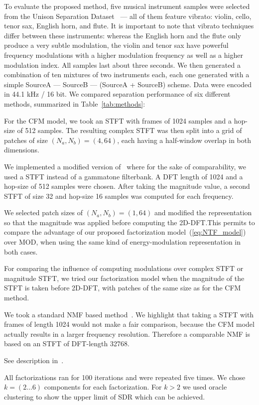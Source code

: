 To evaluate the proposed method, five musical instrument samples were selected from the Unison Separation Dataset~\cite{oss_unison} --- all of them feature vibrato: violin, cello, tenor sax, English horn, and flute. It is important to note that vibrato techniques differ between these instruments: whereas the English horn and the flute only produce a very subtle modulation, the violin and tenor sax have powerful frequency modulations with a higher modulation frequency as well as a higher modulation index. 
All samples last about three seconds. 
We then generated a combination of ten mixtures of two instruments each, each one generated with a simple SourceA --- SourceB --- (SourceA + SourceB) scheme. Data were encoded in 44.1 kHz / 16 bit.
We compared separation performance of six different methods, summarized in Table~\ref{tab:methods}:
\begin{description}[style=unboxed,leftmargin=0cm]
\item[CFM] For the CFM model, we took an STFT with frames of 1024 samples and a hop-size of 512 samples. The resulting complex STFT was then split into a grid of patches of size $(N_a, N_b) = (4, 64)$, each having a half-window overlap in both dimensions.
\item[MOD] We implemented a modified version of~\cite{barker13} where for the sake of comparability, we used a STFT instead of a gammatone filterbank. A DFT length of 1024 and a hop-size of 512 samples were chosen. After taking the magnitude value, a second STFT of size 32 and hop-size 16 samples was computed for each frequency.
\item[CFMMOD] We selected patch sizes of $(N_a, N_b) = (1, 64)$ and modified the representation so that the magnitude was applied before computing the 2D-DFT.\@ This permits to compare the advantage of our proposed factorization model~(\ref{eq:NTF_model}) over MOD, when using the same kind of energy-modulation representation in both cases.
\item[CFMM] For comparing the influence of computing modulations over complex STFT or magnitude STFT, we tried our factorization model when the magnitude of the STFT is taken before 2D-DFT, with patches of the same size as for the CFM method.
\item[NMF] We took a standard NMF based method~\cite{virtanen07}. We highlight that taking a STFT with frames of length 1024 would not make a fair comparison, because the CFM model actually results in a larger frequency resolution. Therefore a comparable NMF is based on an STFT of DFT-length 32768.
\item[HR-NMF] See description in~\cite{magron15a}.
\end{description}
All factorizations ran for 100 iterations and were repeated five times. We chose $k=(2\ldots6)$ components for each factorization. For $k > 2$ we used oracle clustering to show the upper limit of SDR which can be achieved.

